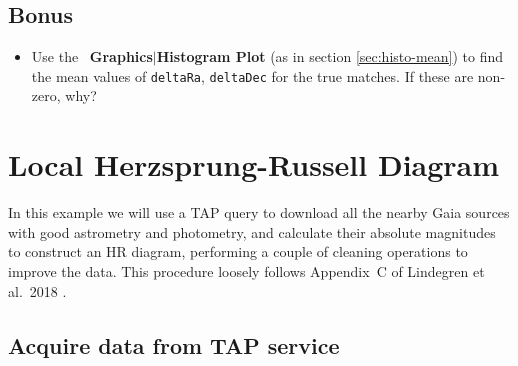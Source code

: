 \documentclass{article}
\newcommand{\buttimg}[1]
           {\mbox{\vtop{\vskip-2ex\hbox{\texttt{[image: \#1]}}}}}
\newcommand{\winfig}[2]
           {\vspace*{-0.5cm}
            \hspace*{0.5cm}\mbox{\vtop{\hbox{\texttt{[image: \#2]}}}}}
\newcommand{\lab}[1]{{\bf #1}}
\newcommand{\mb}[3]{\buttimg{#1}~\lab{#2}$\mid$\lab{#3}}
\begin{document}
\begin{minipage}[t]{11cm}
  \subsection*{Bonus}

  \begin{itemize}
  \item Use the \mb{histo_button.png}{Graphics}{Histogram Plot}
        (as in section \ref{sec:histo-mean})
        to find the mean values of {\tt deltaRa}, {\tt deltaDec} for
        the true matches.
        If these are non-zero, why?
  \end{itemize}
\end{minipage}
\begin{minipage}[t]{8cm}
  \winfig{width=8cm}{n3_skyboth.png}
  \vspace*{1cm}

  \winfig{width=8cm}{n3_pairmatch.png}
\end{minipage}


\newpage
\section{Local Herzsprung-Russell Diagram}
\label{sec:hrd}

In this example we will use a TAP query to download
all the nearby Gaia sources with good astrometry and photometry,
and calculate their absolute magnitudes to construct an HR diagram,
performing a couple of cleaning operations to improve the data.
This procedure loosely follows
Appendix~C of Lindegren et al.\ 2018 \cite{lindegren}.

\subsection{Acquire data from TAP service}
\label{sec:hrd-tap}
\end{document}
